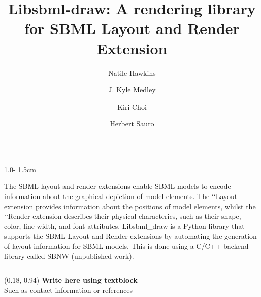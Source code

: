 \documentclass{uioposter}
\title{Libsbml-draw: A rendering library for SBML Layout and Render Extension}
\author
{%
    Natile Hawkins\inst{1}
    \and
    J. Kyle Medley\inst{1}
    \and
    Kiri Choi\inst{1}
    \and
    Herbert Sauro\inst{1}
}
\institute
{
    \inst{1} Department of Mathematics
    \and
    \inst{2} Department of Informatics
}
\begin{document}
\begin{frame}
\begin{columns}[onlytextwidth]


\begin{column}{1.0\textwidth - 1.5cm}
    \begin{block}{}
        The SBML layout and render extensions enable SBML models to encode information about the graphical
        depiction of model elements. The \lq\lq{Layout} extension provides information about the positions
        of model elements, whilst the \lq\lq{Render} extension describes their physical characterics,
        such as their shape, color, line width, and font attributes. Libsbml\_draw is a Python library that
        supports the SBML Layout and Render extensions by automating the generation of layout information for
        SBML models. This is done using a C/C++ backend library called SBNW (unpublished work).
    \end{block}

%
%
%
\end{column}


%
%
%


\end{columns}


\begin{textblock}{0.5}(0.18, 0.94)
    \color{white}
    \sffamily
    \textbf{Write here using textblock}
    \\
    Such as contact information or references
\end{textblock}


\end{frame}
\end{document}
